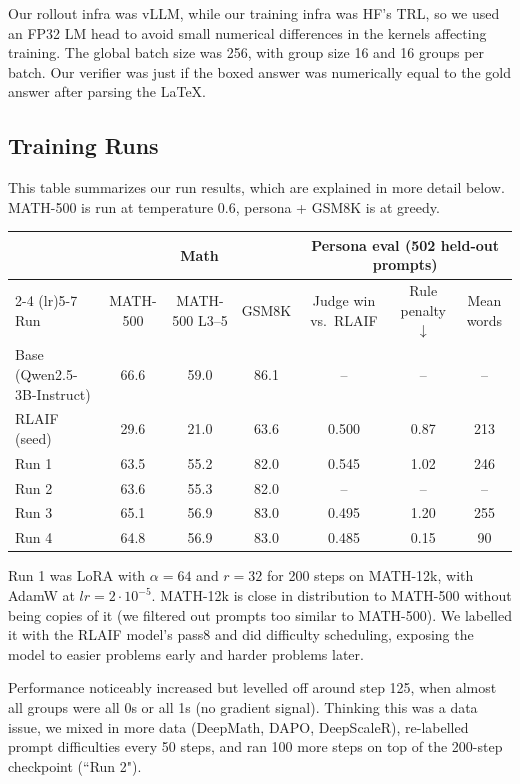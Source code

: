 \documentclass[9pt]{extarticle}
\begin{document}
Our rollout infra was vLLM, while our training infra was HF's TRL, so we used an FP32 LM head to avoid small numerical differences in the kernels affecting training. The global batch size was 256, with group size 16 and 16 groups per batch. Our verifier was just if the boxed answer was numerically equal to the gold answer after parsing the LaTeX.

\subsection{Training Runs}

This table summarizes our run results, which are explained in more detail below. MATH-500 is run at temperature 0.6, persona + GSM8K is at greedy.

\begin{table}[H]
\centering
\small
\begin{tabular}{lcccccc}
\toprule
 & \multicolumn{3}{c}{Math} & \multicolumn{3}{c}{Persona eval (502 held-out prompts)} \\
\cmidrule(lr){2-4} \cmidrule(lr){5-7}
Run & MATH-500 & MATH-500 L3--5 & GSM8K & Judge win vs.\ RLAIF & Rule penalty $\downarrow$ & Mean words \\
\midrule
Base (Qwen2.5-3B-Instruct) & 66.6 & 59.0 & 86.1 & -- & -- & -- \\
RLAIF (seed) & 29.6 & 21.0 & 63.6 & 0.500 & 0.87 & 213 \\
Run 1 & 63.5 & 55.2 & 82.0 & 0.545 & 1.02 & 246 \\
Run 2 & 63.6 & 55.3 & 82.0 & -- & -- & -- \\
Run 3 & 65.1 & 56.9 & 83.0 & 0.495 & 1.20 & 255 \\
Run 4 & 64.8 & 56.9 & 83.0 & 0.485 & 0.15 & 90 \\
\bottomrule
\end{tabular}
\label{tab:rlvr-runs}
\end{table}

Run 1 was LoRA with $\alpha = 64$ and $r = 32$ for 200 steps on MATH-12k, with AdamW at $lr = 2\cdot 10^{-5}$. MATH-12k is close in distribution to MATH-500 without being copies of it (we filtered out prompts too similar to MATH-500). We labelled it with the RLAIF model's pass\@8 and did difficulty scheduling, exposing the model to easier problems early and harder problems later.

Performance noticeably increased but levelled off around step 125, when almost all groups were all 0s or all 1s (no gradient signal). Thinking this was a data issue, we mixed in more data (DeepMath, DAPO, DeepScaleR), re-labelled prompt difficulties every 50 steps, and ran 100 more steps on top of the 200-step checkpoint (``Run 2").
\end{document}
